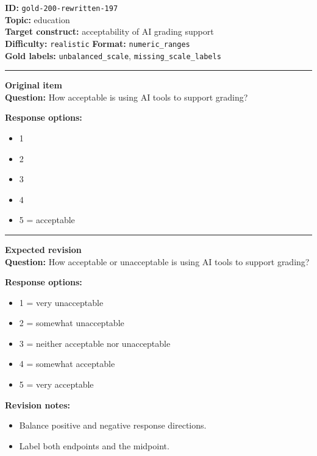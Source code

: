 \documentclass[10pt,a4paper]{article}
\newcommand{\sectionline}{\vspace{0.15em}\hrule\vspace{0.35em}}
\begin{document}
\begin{tcolorbox}[colframe=FlawRed,colback=white,colbacktitle=FlawRed!9,coltitle=black,title={Item 197\hfill Flawed item}]
\textbf{ID:} \texttt{gold-200-rewritten-197}\\
\textbf{Topic:} education\\
\textbf{Target construct:} acceptability of AI grading support\\
\textbf{Difficulty:} \texttt{realistic} \quad \textbf{Format:} \texttt{numeric\_ranges}\\
\textbf{Gold labels:} \texttt{unbalanced\_scale}, \texttt{missing\_scale\_labels}\\
\sectionline
\textbf{Original item}\\
\textbf{Question:} How acceptable is using AI tools to support grading?
\par\textbf{Response options:}
\begin{itemize}
\item 1
\item 2
\item 3
\item 4
\item 5 = acceptable
\end{itemize}
\sectionline
\textbf{Expected revision}\\
\textbf{Question:} How acceptable or unacceptable is using AI tools to support grading?
\par\textbf{Response options:}
\begin{itemize}
\item 1 = very unacceptable
\item 2 = somewhat unacceptable
\item 3 = neither acceptable nor unacceptable
\item 4 = somewhat acceptable
\item 5 = very acceptable
\end{itemize}
\par\textbf{Revision notes:}
\begin{itemize}
\item Balance positive and negative response directions.
\item Label both endpoints and the midpoint.
\end{itemize}
\end{tcolorbox}
\end{document}
